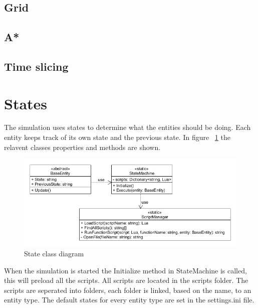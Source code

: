 \documentclass{article}
\begin{document}
   \subsection {Grid}
   \subsection {A*}
   \subsection {Time slicing}
   
 
   \newpage   
   \section {States}
   The simulation uses states to determine what the entities should be doing. Each entity keeps track of its own state and the previous state. In figure ~\ref{fig:stateClassDiagram} the relavent classes properties and methods are shown. 
   \begin{figure}[h!]
   \includegraphics[width=\textwidth]{stateuml.png}
   \caption{State class diagram}
   \label{fig:stateClassDiagram}
   \end{figure}
   When the simulation is started the Initialize method in StateMachine is called, this will preload all the scripts. All scripts are located in the scripts folder. The scripts are seperated into folders, each folder is linked, based on the name, to an entity type.
   The default states for every entity type are set in the settings.ini file.
\end{document}
